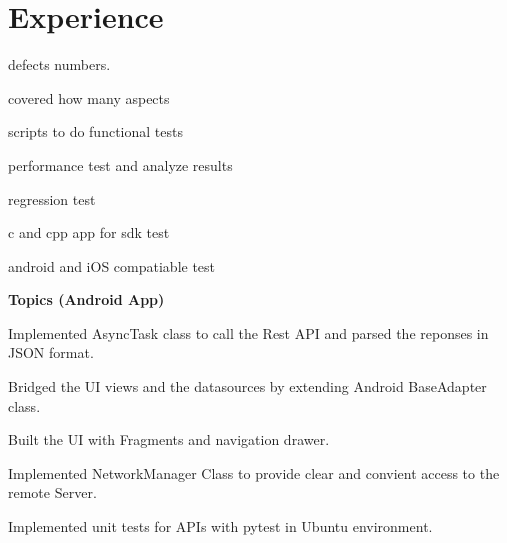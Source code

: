 \documentclass[letterpaper]{lyu-resume} %
\begin{document}
\hfill
%
%
\begin{minipage}[t]{0.66\textwidth} %


\section{Experience}


\vspace{\topsep} %
\begin{tightitemize}
\item defects numbers.
\item covered how many aspects
\item scripts to do functional tests
\item performance test and analyze results
\item regression test
\item c and cpp app for sdk test
\item android and iOS compatiable test
\end{tightitemize}

\sectionspace %



\textbf{Topics (Android App)}
\begin{tightitemize}
\item Implemented AsyncTask class to call the Rest API and parsed the reponses in JSON format.
\item Bridged the UI views and the datasources by extending Android BaseAdapter class.
\item Built the UI with Fragments and navigation drawer.
\item Implemented NetworkManager Class to provide clear and convient access to the remote Server.
\item Implemented unit tests for APIs with pytest in Ubuntu environment. 
\end{tightitemize}


\end{minipage}
\end{document}
